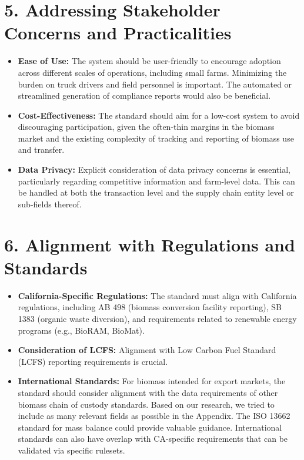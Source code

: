 \documentclass{article}
\begin{document}
\section*{5. Addressing Stakeholder Concerns and Practicalities}
\begin{itemize}
    \item \textbf{Ease of Use:} The system should be user-friendly to encourage adoption across different scales of operations, including small farms. Minimizing the burden on truck drivers and field personnel is important. The automated or streamlined generation of compliance reports would also be beneficial. 
    \item \textbf{Cost-Effectiveness:} The standard should aim for a low-cost system to avoid discouraging participation, given the often-thin margins in the biomass market and the existing complexity of tracking and reporting of biomass use and transfer.
    \item \textbf{Data Privacy:} Explicit consideration of data privacy concerns is essential, particularly regarding competitive information and farm-level data. This can be handled at both the transaction level and the supply chain entity level or sub-fields thereof. 
\end{itemize}

\section*{6. Alignment with Regulations and Standards}
\begin{itemize}
    \item \textbf{California-Specific Regulations:} The standard must align with California regulations, including AB 498 (biomass conversion facility reporting), SB 1383 (organic waste diversion), and requirements related to renewable energy programs (e.g., BioRAM, BioMat).
    \item \textbf{Consideration of LCFS:} Alignment with Low Carbon Fuel Standard (LCFS) reporting requirements is crucial. 
    \item \textbf{International Standards:} For biomass intended for export markets, the standard should consider alignment with the data requirements of other biomass chain of custody standards. Based on our research, we tried to include as many relevant fields as possible in the Appendix. The ISO 13662 standard for mass balance could provide valuable guidance. International standards can also have overlap with CA-specific requirements that can be validated via specific rulesets. 
\end{itemize}
\end{document}
